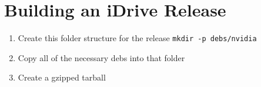\documentclass[letterpaper,10pt,titlepage]{article}
\begin{document}
\section{Building an iDrive Release} \label{building}
\begin{enumerate}
\item Create this folder structure for the release
 \texttt{mkdir -p debs/nvidia}
\item Copy all of the necessary debs into that folder
\item Create a gzipped tarball

\end{enumerate}
\end{document}
